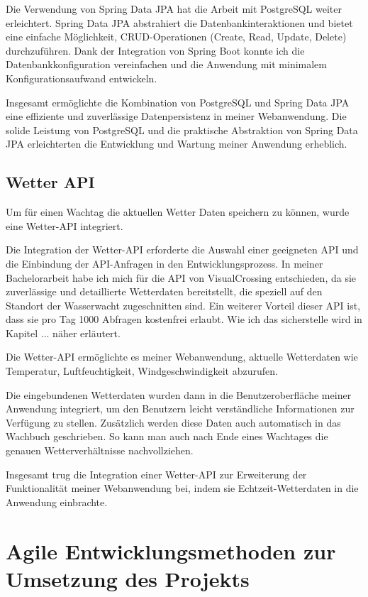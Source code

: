 \documentclass[fontsize=12pt,openright,oneside,paper=a4,BCOR=1cm]{scrbook}
\begin{document}
Die Verwendung von Spring Data JPA hat die Arbeit mit PostgreSQL weiter erleichtert. Spring Data JPA abstrahiert die Datenbankinteraktionen und bietet eine einfache Möglichkeit, CRUD-Operationen (Create, Read, Update, Delete) durchzuführen. Dank der Integration von Spring Boot konnte ich die Datenbankkonfiguration vereinfachen und die Anwendung mit minimalem Konfigurationsaufwand entwickeln.

Insgesamt ermöglichte die Kombination von PostgreSQL und Spring Data JPA eine effiziente und zuverlässige Datenpersistenz in meiner Webanwendung. Die solide Leistung von PostgreSQL und die praktische Abstraktion von Spring Data JPA erleichterten die Entwicklung und Wartung meiner Anwendung erheblich.

\subsection{Wetter API}
Um für einen Wachtag die aktuellen Wetter Daten speichern zu können, wurde eine Wetter-API integriert.

Die Integration der Wetter-API erforderte die Auswahl einer geeigneten API und die Einbindung der API-Anfragen in den Entwicklungsprozess. In meiner Bachelorarbeit habe ich mich für die API von VisualCrossing entschieden, da sie zuverlässige und detaillierte Wetterdaten bereitstellt, die speziell auf den Standort der Wasserwacht zugeschnitten sind. Ein weiterer Vorteil dieser API ist, dass sie pro Tag 1000 Abfragen kostenfrei erlaubt. Wie ich das sicherstelle wird in Kapitel ... näher erläutert.

Die Wetter-API ermöglichte es meiner Webanwendung, aktuelle Wetterdaten wie Temperatur, Luftfeuchtigkeit, Windgeschwindigkeit abzurufen.

Die eingebundenen Wetterdaten wurden dann in die Benutzeroberfläche meiner Anwendung integriert, um den Benutzern leicht verständliche Informationen zur Verfügung zu stellen. Zusätzlich werden diese Daten auch automatisch in das Wachbuch geschrieben. So kann man auch nach Ende eines Wachtages die genauen Wetterverhältnisse nachvollziehen.

Insgesamt trug die Integration einer Wetter-API zur Erweiterung der Funktionalität meiner Webanwendung bei, indem sie Echtzeit-Wetterdaten in die Anwendung einbrachte.


\section{Agile Entwicklungsmethoden zur Umsetzung des Projekts}
\end{document}
